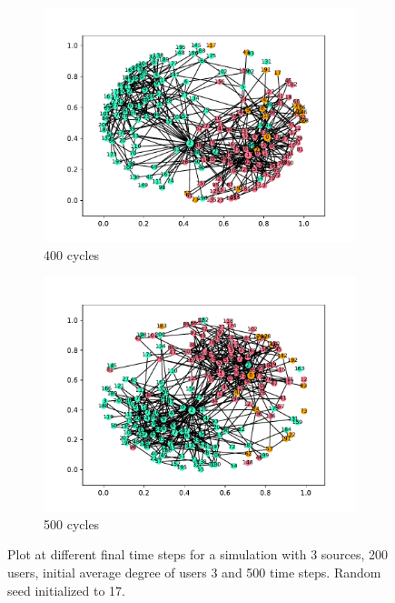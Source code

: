 \begin{figure}
  \begin{subfigure}[t]{.45\textwidth}
    \centering
    \includegraphics[trim={1cm .5cm 1cm 1cm}, clip, width=\linewidth]{img/pdf/plot-0400.pdf} 
    \caption{400 cycles}
    \label{fig:400}
  \end{subfigure}
  \begin{subfigure}[t]{.45\textwidth}
    \centering
    \includegraphics[trim={1cm .5cm 1cm 1cm}, clip, width=\linewidth]{img/pdf/plot-0500.pdf} 
    \caption{500 cycles}
    \label{fig:500}
  \end{subfigure}
 
  \caption{Plot at different final time steps for a simulation with 3 sources, 200 users, initial average degree of users 3 and 500 time steps. Random seed initialized to 17.}
\end{figure}

